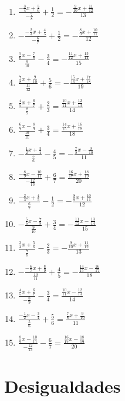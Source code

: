 \documentclass[12pt]{article}
\begin{document}
\begin{enumerate}
  \begin{enumerate}
  \def\labelenumii{\roman{enumii}.}
  \item
    \(\frac{-\frac{3}{4}x+\frac{5}{6}}{-\frac{7}{8}}+\frac{1}{2}=-\frac{\frac{9}{10}x+\frac{11}{12}}{13}\)
  \item
    \(-\frac{-\frac{2}{3}x+\frac{4}{5}}{-\frac{6}{7}}+\frac{1}{2}=-\frac{\frac{8}{9}x+\frac{10}{11}}{12}\)
  \item
    \(\frac{\frac{5}{6}x-\frac{7}{8}}{\frac{9}{10}}-\frac{3}{4}=-\frac{\frac{11}{12}x+\frac{13}{14}}{15}\)
  \item
    \(\frac{\frac{7}{8}x+\frac{9}{10}}{\frac{11}{12}}+\frac{5}{6}=-\frac{\frac{15}{16}x+\frac{17}{18}}{19}\)
  \item
    \(\frac{\frac{4}{5}x+\frac{6}{7}}{\frac{8}{9}}+\frac{2}{3}=\frac{\frac{10}{11}x+\frac{12}{13}}{14}\)
  \item
    \(\frac{\frac{6}{7}x-\frac{8}{9}}{\frac{10}{11}}+\frac{3}{4}=\frac{\frac{14}{15}x+\frac{16}{17}}{18}\)
  \item
    \(-\frac{\frac{1}{2}x+\frac{3}{4}}{\frac{5}{6}}-\frac{4}{5}=-\frac{\frac{7}{8}x-\frac{9}{10}}{11}\)
  \item
    \(\frac{-\frac{8}{9}x-\frac{10}{11}}{-\frac{12}{13}}+\frac{6}{7}=\frac{\frac{16}{17}x+\frac{18}{19}}{20}\)
  \item
    \(\frac{-\frac{2}{3}x+\frac{4}{5}}{\frac{6}{7}}-\frac{1}{2}=-\frac{\frac{8}{9}x+\frac{10}{11}}{12}\)
  \item
    \(-\frac{\frac{5}{6}x-\frac{7}{8}}{\frac{9}{10}}+\frac{3}{4}=-\frac{\frac{11}{12}x-\frac{13}{14}}{15}\)
  \item
    \(\frac{\frac{3}{4}x+\frac{5}{6}}{\frac{7}{8}}-\frac{2}{3}=-\frac{\frac{9}{10}x+\frac{11}{12}}{13}\)
  \item
    \(-\frac{-\frac{6}{7}x+\frac{8}{9}}{\frac{10}{11}}+\frac{4}{5}=-\frac{\frac{14}{15}x-\frac{16}{17}}{18}\)
  \item
    \(\frac{\frac{4}{5}x+\frac{6}{7}}{-\frac{8}{9}}-\frac{3}{4}=\frac{\frac{10}{11}x-\frac{12}{13}}{14}\)
  \item
    \(\frac{-\frac{1}{2}x-\frac{3}{4}}{\frac{5}{6}}+\frac{5}{6}=\frac{\frac{7}{8}x+\frac{9}{10}}{11}\)
  \item
    \(\frac{\frac{8}{9}x-\frac{10}{11}}{-\frac{12}{13}}-\frac{6}{7}=\frac{\frac{16}{17}x-\frac{18}{19}}{20}\)
  \end{enumerate}
\end{enumerate}

\section{Desigualdades}\label{desigualdades}
\end{document}
